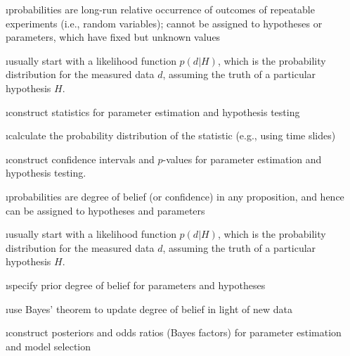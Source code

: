 
\bi

\i probabilities are long-run relative occurrence of 
outcomes of repeatable experiments (i.e., random variables);
cannot be assigned to hypotheses or parameters, 
which have fixed but unknown values

\i usually start with a likelihood function $p(d|H)$,
which is the probability distribution for the 
measured data $d$, assuming the truth of a particular
hypothesis $H$.

\i construct statistics for parameter estimation and
hypothesis testing

\i calculate the probability distribution of the 
statistic (e.g., using time slides)

\i construct confidence intervals and $p$-values for 
parameter estimation and hypothesis testing.

\ei


\bi

\i probabilities are degree of belief (or confidence)
in any proposition, and hence 
can be assigned to hypotheses and parameters

\i usually start with a likelihood function $p(d|H)$,
which is the probability distribution for the 
measured data $d$, assuming the truth of a particular
hypothesis $H$.

\i specify prior degree of belief for parameters and 
hypotheses

\i use Bayes' theorem to update degree of belief in
light of new data 

\i construct posteriors and odds ratios (Bayes factors)
for parameter estimation and model selection

\ei
\medskip

